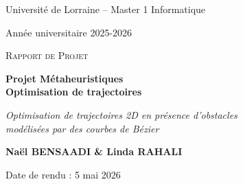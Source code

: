 \documentclass[a4paper,11pt]{article}
\begin{document}
\begin{titlepage}
    \centering
    {\large Université de Lorraine -- Master 1 Informatique \par}
    {\large Année universitaire 2025-2026 \par}

    \vspace{3cm}

    {\scshape\Large Rapport de Projet \par}
    \vspace{1cm}
    {\Huge\bfseries Projet Métaheuristiques \\ Optimisation de trajectoires \par}
    \vspace{1.5cm}

    {\Large\itshape Optimisation de trajectoires 2D en présence d'obstacles \\ modélisées par des courbes de Bézier \par}

    \vspace{3cm}

    \textbf{\Large Naël BENSAADI \& Linda RAHALI}\par

    \vfill

    {\large Date de rendu : 5 mai 2026 \par}
\end{titlepage}

\pagestyle{plain}

\begin{abstract}
Ce rapport présente la conception d'une métaheuristique pour l'optimisation de
trajectoires 2D modélisées par des courbes de Bézier en présence d'obstacles.
Après une phase exploratoire évaluant 19~algorithmes et variantes couvrant
quatre familles (GA, DE/SHADE, CMA-ES/BIPOP, PSO), nous concevons
\emph{OptiPath}, un algorithme basé sur CMA-ES combinant seeding massif,
portfolio à deux marges de bornes étendues et restart adaptatif.  OptiPath
obtient en moyenne sur 10~exécutions : $36{,}80$ (\texttt{prob1}), $31{,}42$
(\texttt{prob2}), $29{,}02$ (\texttt{prob3}) et $94{,}60$ (\texttt{prob4}),
réduisant le coût sur l'instance labyrinthique d'un facteur~16 par rapport aux
meilleures méthodes de la phase exploratoire.
\end{abstract}
\thispagestyle{empty}
\newpage

\tableofcontents
{}
\newpage

\pagestyle{fancy}













\end{document}
